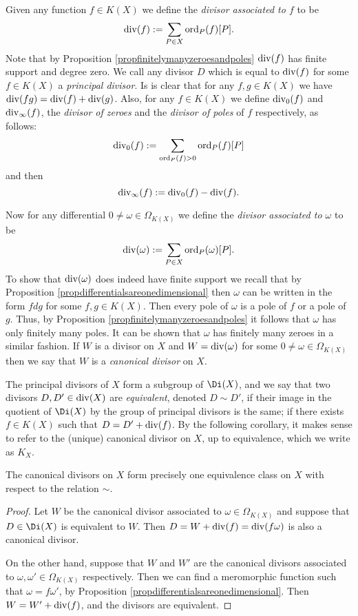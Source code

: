 Given any function $f \in K(X)$ we define the \emph{divisor associated to $f$} to be
    \[
    \operatorname{div}(f) := \sum_{P \in X} \operatorname{ord}_P(f) [P].
    \]
Note that by Proposition \ref{propfinitelymanyzeroesandpoles} $\operatorname{div}(f)$ has finite support and degree zero.
We call any divisor $D$ which is equal to $\operatorname{div}(f)$ for some $f \in K(X)$ a \emph{principal divisor}.
Is is clear that for any $f, g \in K(X)$ we have $\operatorname{div}(fg) = \operatorname{div}(f) + \operatorname{div}(g)$.
Also, for any $f \in K(X)$ we define $\operatorname{div}_0(f)$ and $\operatorname{div}_\infty (f)$, the \emph{divisor of zeroes} and the \emph{divisor of poles} of $f$ respectively, as follows:
    \[
    \operatorname{div}_0(f) := \sum_{\operatorname{ord}_P(f) >0} \operatorname{ord}_P(f)[P]
    \]
and then
    \[
    \operatorname{div}_\infty(f) := \operatorname{div}_0(f) - \operatorname{div}(f).
    \]

Now for any differential $0 \neq \omega \in \Omega_{K(X)}$ we define the \emph{divisor associated to $\omega$} to be
    \[
    \operatorname{div}(\omega) := \sum_{P \in X} \operatorname{ord}_P(\omega)[P].
    \]
To show that $\operatorname{div}(\omega)$ does indeed have finite support we recall that by Proposition \ref{propdifferentialsareonedimensional} then $\omega$ can be written in the form $fdg$ for some $f, g \in K(X)$.
Then every pole of $\omega$ is a pole of $f$ or a pole of $g$.
Thus, by Proposition \ref{propfinitelymanyzeroesandpoles} it follows that $\omega$ has only finitely many poles.
It can be shown that $\omega$ has finitely many zeroes in a similar fashion.
If $W$ is a divisor on $X$ and $W = \operatorname{div}(\omega)$ for some $ 0 \neq \omega \in \Omega_{K(X)}$ then we say that $W$ is a \emph{canonical divisor} on $X$.

The principal divisors of $X$ form a subgroup of $\Di(X)$, and we say that two divisors $D, D' \in \operatorname{div}(X)$ are \emph{equivalent}, denoted $D \sim D'$, if their image in the quotient of $\Di(X)$ by the group of principal divisors is the same; \ie if there exists $f \in K(X)$ such that $ D = D' + \operatorname{div}(f)$.
By the following corollary, it makes sense to refer to the (unique) canonical divisor on $X$, up to equivalence, which we write as $K_X$.

    \begin{cor}
    The canonical divisors on $X$ form precisely one equivalence class on $X$ with respect to the relation $\sim$.
    \end{cor}
    \begin{proof}
    Let $W$ be the canonical divisor associated to $\omega \in \Omega_{K(X)}$ and suppose that $D \in \Di(X)$ is equivalent to $W$.
    Then $D = W + \operatorname{div}(f) = \operatorname{div}(f \omega)$ is also a canonical divisor.

    On the other hand, suppose that $W$ and $W'$ are the canonical divisors associated to $\omega, \omega' \in \Omega_{K(X)}$ respectively.
    Then we can find a meromorphic function such that $\omega = f\omega'$, by Proposition \ref{propdifferentialsareonedimensional}.
    Then $W = W' + \operatorname{div}(f)$, and the divisors are equivalent.
    \end{proof}

